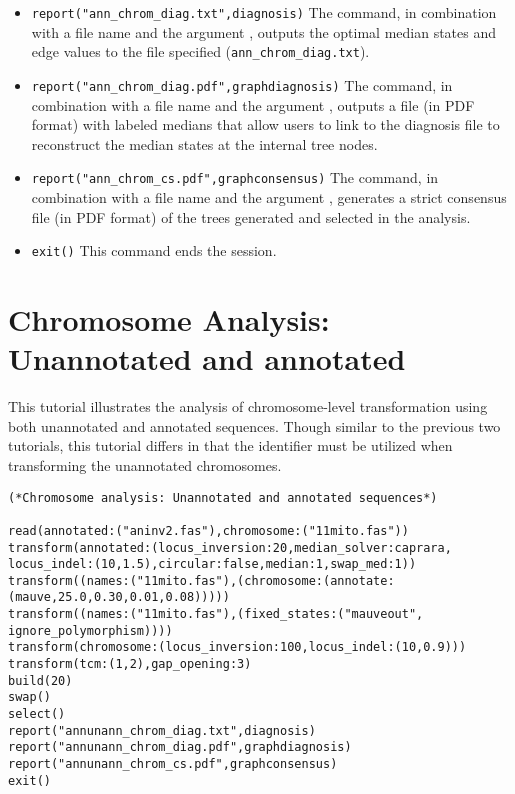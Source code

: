 \begin{itemize}
\item \texttt{report("ann\_chrom\_diag.txt",diagnosis)}  The  command, in combination with a file name and 
the argument , outputs the optimal median states and edge values to the file specified 
(\texttt{ann\_chrom\_diag.txt}). 
\item \texttt{report("ann\_chrom\_diag.pdf",graphdiagnosis)}  The  command, in combination 
with a file name and the argument  , outputs a file (in PDF format) with labeled 
medians that allow users to link to the diagnosis file to reconstruct the median states at the internal tree nodes.
\item \texttt{report("ann\_chrom\_cs.pdf",graphconsensus)}  The  command, in combination with a file 
name and the argument , generates a strict consensus file (in PDF format) of the trees generated 
and selected in the analysis.
\item \texttt{exit()} This command ends the \poy session.
\end{itemize}


\section{Chromosome Analysis: Unannotated and annotated}{\label{tutorial10}}
This tutorial illustrates the analysis of chromosome-level transformation using both unannotated and annotated sequences.
Though similar to the previous two tutorials, this tutorial differs in that the identifier  must be utilized when 
transforming the unannotated chromosomes.

\begin{verbatim}
(*Chromosome analysis: Unannotated and annotated sequences*)

read(annotated:("aninv2.fas"),chromosome:("11mito.fas"))
transform(annotated:(locus_inversion:20,median_solver:caprara,
locus_indel:(10,1.5),circular:false,median:1,swap_med:1))
transform((names:("11mito.fas"),(chromosome:(annotate:
(mauve,25.0,0.30,0.01,0.08)))))
transform((names:("11mito.fas"),(fixed_states:("mauveout",
ignore_polymorphism))))
transform(chromosome:(locus_inversion:100,locus_indel:(10,0.9)))
transform(tcm:(1,2),gap_opening:3)
build(20)
swap()
select()
report("annunann_chrom_diag.txt",diagnosis)
report("annunann_chrom_diag.pdf",graphdiagnosis)
report("annunann_chrom_cs.pdf",graphconsensus)
exit()
\end{verbatim}

